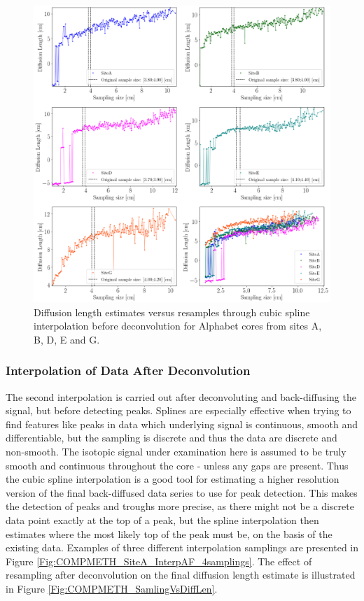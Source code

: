 \documentclass[../../CompleteThesis2/Complete_2ndDraft]{subfiles}
\begin{document}
\begin{figure}[h]
	\centering
	\includegraphics[width=\textwidth]{AllCores_DiffLenVdelta_InterpBF_const.png}
	\caption[Diffusion length versus resampling size before deconvolution, all cores.]{\small Diffusion length estimates versus resamples through cubic spline interpolation before deconvolution for Alphabet cores from sites A, B, D, E and G.}
	\label{Fig:COMPMETH_SamplingVsDiffLen_interpBF}
\end{figure}



\subsubsection[Interpolation 2]{Interpolation of Data After Deconvolution}
\label{Subsubsec:CompMethod_StabilityTests_Interpolation2}

The second interpolation is carried out after deconvoluting and back-diffusing the signal, but before detecting peaks. Splines are especially effective when trying to find features like peaks in data which underlying signal is continuous, smooth and differentiable, but the sampling is discrete and thus the data are discrete and non-smooth. The isotopic signal under examination here is assumed to be truly smooth and continuous throughout the core - unless any gaps are present. Thus the cubic spline interpolation is a good tool for estimating a higher resolution version of the final back-diffused data series to use for peak detection. This makes the detection of peaks and troughs more precise, as there might not be a discrete data point exactly at the top of a peak, but the spline interpolation then estimates where the most likely top of the peak must be, on the basis of the existing data. Examples of three different interpolation samplings are presented in Figure \ref{Fig:COMPMETH_SiteA_InterpAF_4samplings}. The effect of resampling after deconvolution on the final diffusion length estimate is illustrated in Figure \ref{Fig:COMPMETH_SamlingVsDiffLen}.
\end{document}
